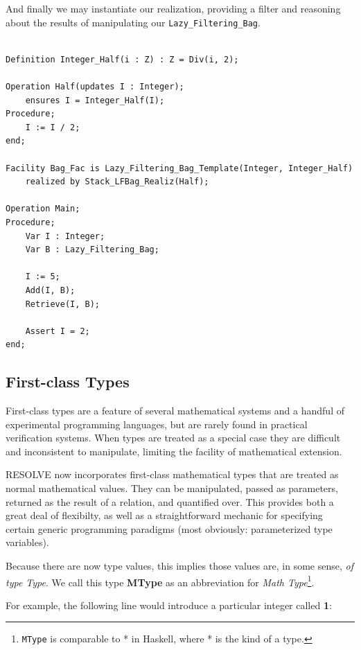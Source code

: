 And finally we may instantiate our realization, providing a filter and reasoning about the results of manipulating our \texttt{Lazy\_Filtering\_Bag}.

\begin{lstlisting}

Definition Integer_Half(i : Z) : Z = Div(i, 2);

Operation Half(updates I : Integer);
	ensures I = Integer_Half(I); 
Procedure;
	I := I / 2;
end;

Facility Bag_Fac is Lazy_Filtering_Bag_Template(Integer, Integer_Half)
	realized by Stack_LFBag_Realiz(Half);

Operation Main;
Procedure;
	Var I : Integer;
	Var B : Lazy_Filtering_Bag;

	I := 5;
	Add(I, B);
	Retrieve(I, B);

	Assert I = 2;
end;
\end{lstlisting}

	\subsection{First-class Types\label{firstClassTypes}}

First-class types are a feature of several mathematical systems and a handful of experimental programming languages, but are rarely found in practical verification systems.  When types are treated as a special case they are difficult and inconsistent to manipulate, limiting the facility of mathematical extension.

RESOLVE now incorporates first-class mathematical types that are treated as normal mathematical values.  They can be manipulated, passed as parameters, returned as the result of a relation, and quantified over.  This provides both a great deal of flexibilty, as well as a straightforward mechanic for specifying certain generic programming paradigms (most obviously: parameterized type variables).

Because there are now type values, this implies those values are, in some sense, \emph{of type Type}.  We call this type \textbf{MType} as an abbreviation for \emph{Math Type}\footnote{\texttt{MType} is comparable to * in Haskell, where * is the kind of a type.}.

For example, the following line would introduce a particular integer called \textbf{1}:

